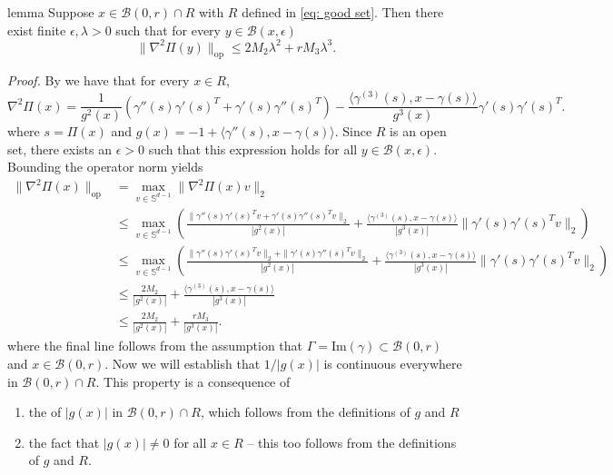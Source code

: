 \documentclass[11pt]{article}
\begin{document}
\begin{restatable}{lemma}{} \label{lemma: operator norm bound}
    Suppose $x \in \mathcal{B}(0,r) \cap R$ with $R$ defined in \cref{eq: good set}. Then there exist finite $\epsilon, \lambda > 0$ such that for every $y\in \mathcal{B}(x,\epsilon)$ 
    \[\|\nabla^2\Pi(y)\|_{\text{op}} \leq 2M_2\lambda^{2}+rM_3\lambda^{3}.\]
\end{restatable}

\noindent \textit{Proof.} By  we have that for every $x \in R$, 
\[\nabla^2\Pi(x) = \frac{1}{g^2(x)}\left(\gamma''(s)\gamma'(s)^T + \gamma'(s)\gamma''(s)^T\right)- \frac{\langle\gamma^{(3)}(s), x - \gamma(s)\rangle}{g^3(x)}\gamma'(s)\gamma'(s)^T.\]
where $s = \Pi(x)$ and $g(x) = -1 + \langle\gamma''(s), x-\gamma(s)\rangle$. Since $R$ is an open set, there exists an $\epsilon > 0$ such that this expression holds for all $y \in \mathcal{B}(x, \epsilon)$.  Bounding the operator norm yields
\begin{align*}
    \|\nabla^2\Pi(x)\|_{\text{op}} &= \max_{v\in \mathbb{S}^{d-1}} \|\nabla^2\Pi(x)v\|_2 \\
    &\leq \max_{v\in \mathbb{S}^{d-1}}\left(\frac{\|\gamma''(s)\gamma'(s)^Tv + \gamma'(s)\gamma''(s)^Tv\|_2}{|g^2(x)|} + \frac{\langle\gamma^{(3)}(s), x - \gamma(s)\rangle}{|g^3(x)|} \|\gamma'(s)\gamma'(s)^Tv\|_2\right) \\
    &\leq \max_{v\in \mathbb{S}^{d-1}}\left(\frac{\|\gamma''(s)\gamma'(s)^Tv\|_2 + \|\gamma'(s)\gamma''(s)^Tv\|_2}{|g^2(x)|} + \frac{\langle\gamma^{(3)}(s), x - \gamma(s)\rangle}{|g^3(x)|} \|\gamma'(s)\gamma'(s)^Tv\|_2\right) \\
    &\leq \frac{2M_2}{|g^2(x)|} + \frac{\langle\gamma^{(3)}(s), x - \gamma(s)\rangle}{|g^3(x)|} \\
    &\leq \frac{2M_2}{|g^2(x)|} + \frac{r M_3}{|g^3(x)|}.
\end{align*}
where the final line follows from the assumption that $\Gamma = \text{Im}(\gamma) \subset \mathcal{B}(0, r)$ and $x \in \mathcal{B}(0, r)$. Now we will establish that $1/|g(x)|$ is continuous everywhere in $\mathcal{B}(0,r) \cap R$. This property is a consequence of 
\begin{enumerate}
    \item the of $|g(x)|$ in $\mathcal{B}(0,r) \cap R$, which follows from the definitions of $g$ and $R$
    \item the fact that $|g(x)| \neq 0$ for all $x \in R$ -- this too follows from the definitions of $g$ and $R$.
\end{enumerate}
\end{document}
